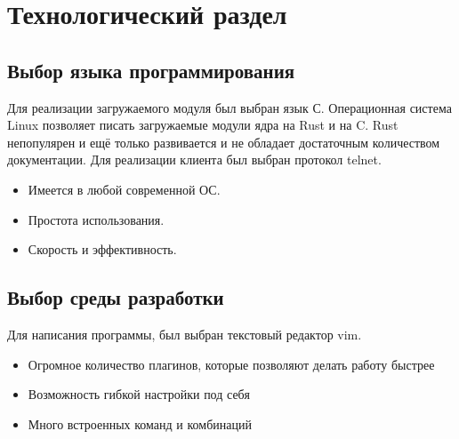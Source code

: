 \chapter{Технологический раздел}

\section{Выбор  языка программирования}
Для реализации загружаемого модуля был выбран язык С. 
Операционная система Linux позволяет писать загружаемые модули ядра на Rust и на C. 
Rust непопулярен и ещё только развивается и не обладает достаточным количеством документации.
Для реализации клиента был выбран протокол telnet.
\begin{itemize}
	 \item Имеется в любой современной ОС. 
	 \item Простота использования.
	 \item Скорость и эффективность.
\end{itemize}

\section{Выбор среды разработки}
Для написания программы, был выбран текстовый редактор vim.
\begin{itemize}
	\item Огромное количество плагинов, которые позволяют делать работу быстрее
	\item Возможность гибкой настройки под себя
	\item Много встроенных команд и комбинаций
\end{itemize}

